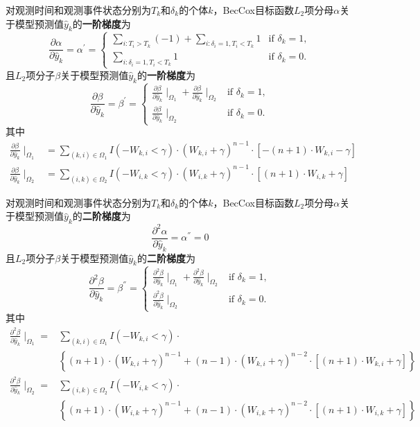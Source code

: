 \begin{theorem}\label{thm:2.3}
对观测时间和观测事件状态分别为$T_k$和$\delta_k$的个体$k$，BecCox目标函数$L_2$项分母$\alpha$关于模型预测值$\hat{y}_k$的\textbf{一阶梯度}为$$
\frac{\partial \alpha}{\partial \hat{y}_k}=\alpha^{'}=
\begin{cases}
\sum\limits_{i: T_i>T_k}(-1) + \sum\limits_{i: \delta_i=1,T_i<T_k} 1 & \text{if } \delta_k = 1,\\
\sum\limits_{i: \delta_i=1,T_i<T_k} 1 & \text{if } \delta_k = 0.
\end{cases}
$$ 且$L_2$项分子$\beta$关于模型预测值$\hat{y}_k$的\textbf{一阶梯度}为$$
\frac{\partial \beta}{\partial \hat{y}_k}=\beta^{'}=
\begin{cases}
\frac{\partial \beta}{\partial \hat{y}_k} \mid_{\Omega_1} + \frac{\partial \beta}{\partial \hat{y}_k} \mid_{\Omega_2} & \text{if } \delta_k = 1,\\
\frac{\partial \beta}{\partial \hat{y}_k} \mid_{\Omega_2} & \text{if } \delta_k = 0.
\end{cases}
$$ 其中\[
\begin{split}
\frac{\partial \beta}{\partial \hat{y}_k} \mid_{\Omega_1} &= \sum\limits_{(k,i)\in \Omega_1} {I(-W_{k,i}<\gamma)\cdot (W_{k,i}+\gamma)^{n-1}\cdot [-(n+1)\cdot W_{k,i}-\gamma]} \\
\frac{\partial \beta}{\partial \hat{y}_k} \mid_{\Omega_2} &= \sum\limits_{(i,k)\in \Omega_2} {I(-W_{i,k}<\gamma)\cdot (W_{i,k}+\gamma)^{n-1}\cdot [(n+1)\cdot W_{i,k}+\gamma]}
\end{split}
\]
\end{theorem}

\begin{theorem}\label{thm:2.4}
对观测时间和观测事件状态分别为$T_k$和$\delta_k$的个体$k$，BecCox目标函数$L_2$项分母$\alpha$关于模型预测值$\hat{y}_k$的\textbf{二阶梯度}为$$
\frac{\partial^2 \alpha}{\partial \hat{y}_k}=\alpha^{''}=0
$$ 且$L_2$项分子$\beta$关于模型预测值$\hat{y}_k$的\textbf{二阶梯度}为$$
\frac{\partial^2 \beta}{\partial \hat{y}_k}=\beta^{''}=
\begin{cases}
\frac{\partial^2 \beta}{\partial \hat{y}_k} \mid_{\Omega_1} + \frac{\partial^2 \beta}{\partial \hat{y}_k} \mid_{\Omega_2} & \text{if } \delta_k = 1,\\
\frac{\partial^2 \beta}{\partial \hat{y}_k} \mid_{\Omega_2} & \text{if } \delta_k = 0.
\end{cases}
$$ 其中\[
\begin{split}
\frac{\partial^2 \beta}{\partial \hat{y}_k} \mid_{\Omega_1} =& \sum\limits_{(k,i)\in \Omega_1} I(-W_{k,i}<\gamma)\cdot \\
  & \left\{(n+1)\cdot (W_{k,i}+\gamma)^{n-1} + (n-1)\cdot (W_{k,i}+\gamma)^{n-2}\cdot [(n+1)\cdot W_{k,i}+\gamma]\right\} \\
\frac{\partial^2 \beta}{\partial \hat{y}_k} \mid_{\Omega_2} =& \sum\limits_{(i,k)\in \Omega_2} I(-W_{i,k}<\gamma)\cdot \\
  & \left\{(n+1)\cdot (W_{i,k}+\gamma)^{n-1} + (n-1)\cdot (W_{i,k}+\gamma)^{n-2}\cdot [(n+1)\cdot W_{i,k}+\gamma]\right\}
\end{split}
\]
\end{theorem}

